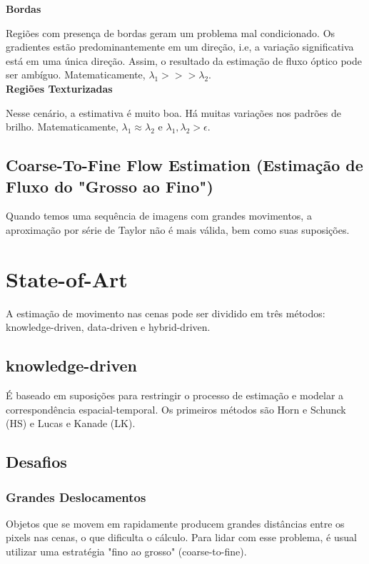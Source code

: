 \documentclass[12pt, a4paper]{article}
\begin{document}
\textbf{Bordas}

Regiões com presença de bordas geram um problema mal condicionado. Os gradientes estão predominantemente em um direção, i.e, a variação significativa está em uma única direção. Assim, o resultado da estimação de fluxo óptico pode ser ambíguo. Matematicamente, $\lambda_1 >>> \lambda_2$. \\

\textbf{Regiões Texturizadas}

Nesse cenário, a estimativa é muito boa. Há muitas variações nos padrões de brilho. Matematicamente, $\lambda_1 \approx \lambda_2$ e $\lambda_1, \lambda_2 > \epsilon$.

\subsection{Coarse-To-Fine Flow Estimation (Estimação de Fluxo do "Grosso ao Fino") }

Quando temos uma sequência de imagens com grandes movimentos, a aproximação por série de Taylor não é mais válida, bem como suas suposições.


\section{State-of-Art}

A estimação de movimento nas cenas pode ser dividido em três métodos: knowledge-driven, data-driven e hybrid-driven. 

\subsection{knowledge-driven}

É baseado em suposições para restringir o processo de estimação e modelar a correspondência espacial-temporal. Os primeiros métodos são Horn e Schunck (HS) e Lucas e Kanade (LK). 

\subsection{Desafios}

\subsubsection{Grandes Deslocamentos}

Objetos que se movem em rapidamente producem grandes distâncias entre os pixels nas cenas, o que dificulta o cálculo. Para lidar com esse problema, é usual utilizar uma estratégia "fino ao grosso" (coarse-to-fine).
\end{document}
